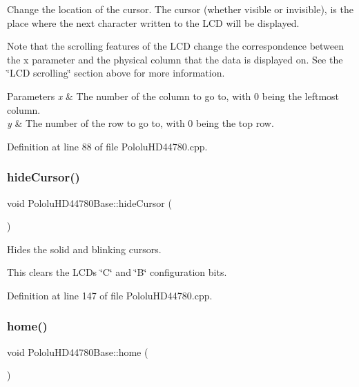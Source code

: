 Change the location of the cursor. The cursor (whether visible or invisible), is the place where the next character written to the L\+CD will be displayed.

Note that the scrolling features of the L\+CD change the correspondence between the {\ttfamily x} parameter and the physical column that the data is displayed on. See the \char`\"{}\+L\+C\+D scrolling\char`\"{} section above for more information.


\begin{DoxyParams}{Parameters}
{\em x} & The number of the column to go to, with 0 being the leftmost column. \\
\hline
{\em y} & The number of the row to go to, with 0 being the top row. \\
\hline
\end{DoxyParams}


Definition at line 88 of file Pololu\+H\+D44780.\+cpp.

\mbox{\label{class_pololu_h_d44780_base_a1db083d254d251c479a577f29bcdcec8}} 
\subsubsection{\texorpdfstring{hide\+Cursor()}{hideCursor()}}
{\footnotesize\ttfamily void Pololu\+H\+D44780\+Base\+::hide\+Cursor (\begin{DoxyParamCaption}{ }\end{DoxyParamCaption})}

Hides the solid and blinking cursors.

This clears the L\+CD\textquotesingle{}s \char`\"{}\+C\char`\"{} and \char`\"{}\+B\char`\"{} configuration bits. 

Definition at line 147 of file Pololu\+H\+D44780.\+cpp.

\mbox{\label{class_pololu_h_d44780_base_ab2d24add3c6da0328055bceb38a6d42c}} 
\subsubsection{\texorpdfstring{home()}{home()}}
{\footnotesize\ttfamily void Pololu\+H\+D44780\+Base\+::home (\begin{DoxyParamCaption}{ }\end{DoxyParamCaption})}

